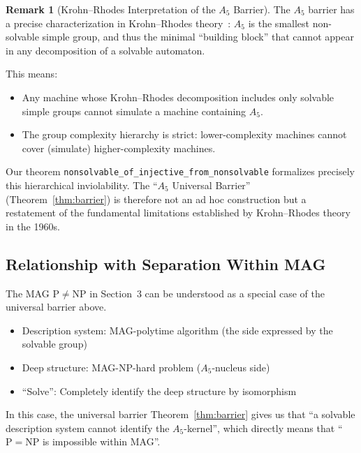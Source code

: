 \documentclass[11pt,a4paper]{article}
\theoremstyle{plain}
\theoremstyle{definition}
\newtheorem{remark}[theorem]{Remark}
\newcommand{\Aalt}{A_5}
\newcommand{\lean}[1]{\texttt{#1}}
\begin{document}
\begin{remark}[Krohn--Rhodes Interpretation of the $\Aalt$ Barrier]\label{rem:krohnrhodes-barrier}
The $\Aalt$ barrier has a precise characterization in Krohn--Rhodes theory~\cite{krohnrhodes1965,rhodesqtheory}: $\Aalt$ is the smallest non-solvable simple group, and thus the minimal ``building block'' that cannot appear in any decomposition of a solvable automaton.

This means:
\begin{itemize}[nosep]
\item Any machine whose Krohn--Rhodes decomposition includes only solvable simple groups cannot simulate a machine containing $\Aalt$.
\item The group complexity hierarchy is strict: lower-complexity machines cannot cover (simulate) higher-complexity machines.
\end{itemize}

Our theorem \lean{nonsolvable\_of\_injective\_from\_nonsolvable} formalizes precisely this hierarchical inviolability. The ``$\Aalt$ Universal Barrier'' (Theorem~\ref{thm:barrier}) is therefore not an ad hoc construction but a restatement of the fundamental limitations established by Krohn--Rhodes theory in the 1960s.
\end{remark}

\subsection{Relationship with Separation Within MAG}

The MAG $\mathrm{P} \neq \mathrm{NP}$ in Section~3 can be understood as a special case of the universal barrier above.
\begin{itemize}[nosep]
\item Description system: MAG-polytime algorithm (the side expressed by the solvable group)
\item Deep structure: MAG-NP-hard problem ($\Aalt$-nucleus side)
\item ``Solve'': Completely identify the deep structure by isomorphism
\end{itemize}
In this case, the universal barrier Theorem~\ref{thm:barrier} gives us that ``a solvable description system cannot identify the $\Aalt$-kernel'', which directly means that ``$\mathrm{P}=\mathrm{NP}$ is impossible within MAG''.
\end{document}
